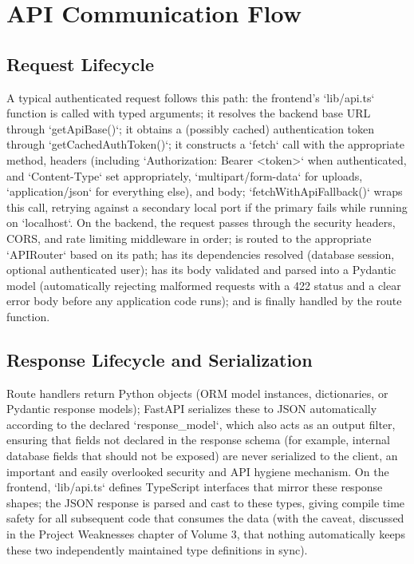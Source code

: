 \documentclass[11pt,a4paper]{report}
\begin{document}
\chapter{API Communication Flow}

\section{Request Lifecycle}

A typical authenticated request follows this path: the frontend's `lib/api.ts` function is called with typed arguments; it resolves the backend base URL through `getApiBase()`; it obtains a (possibly cached) authentication token through `getCachedAuthToken()`; it constructs a `fetch` call with the appropriate method, headers (including `Authorization: Bearer <token>` when authenticated, and `Content-Type` set appropriately, `multipart/form-data` for uploads, `application/json` for everything else), and body; `fetchWithApiFallback()` wraps this call, retrying against a secondary local port if the primary fails while running on `localhost`. On the backend, the request passes through the security headers, CORS, and rate limiting middleware in order; is routed to the appropriate `APIRouter` based on its path; has its dependencies resolved (database session, optional authenticated user); has its body validated and parsed into a Pydantic model (automatically rejecting malformed requests with a 422 status and a clear error body before any application code runs); and is finally handled by the route function.

\section{Response Lifecycle and Serialization}

Route handlers return Python objects (ORM model instances, dictionaries, or Pydantic response models); FastAPI serializes these to JSON automatically according to the declared `response_model`, which also acts as an output filter, ensuring that fields not declared in the response schema (for example, internal database fields that should not be exposed) are never serialized to the client, an important and easily overlooked security and API hygiene mechanism. On the frontend, `lib/api.ts` defines TypeScript interfaces that mirror these response shapes; the JSON response is parsed and cast to these types, giving compile time safety for all subsequent code that consumes the data (with the caveat, discussed in the Project Weaknesses chapter of Volume 3, that nothing automatically keeps these two independently maintained type definitions in sync).
\end{document}
